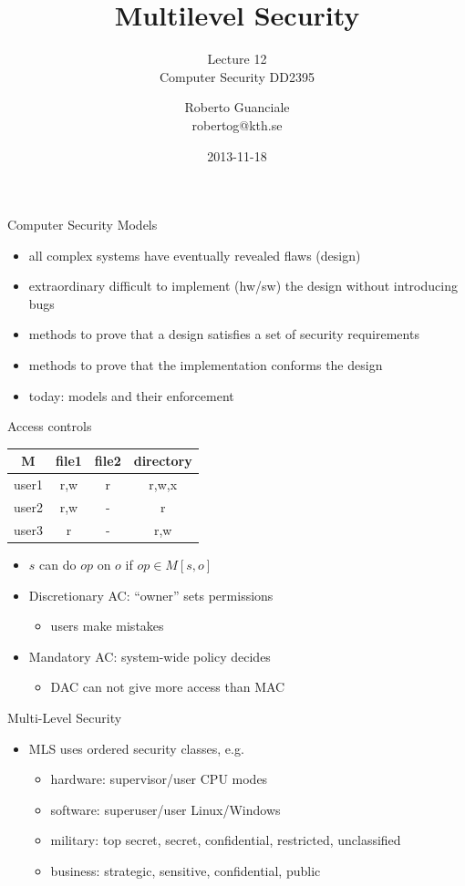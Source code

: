 \documentclass{beamer}
\title{Multilevel Security}
\subtitle{Lecture 12 \\ Computer Security DD2395}
\author[R. Guanciale]{
  Roberto Guanciale\\
  robertog@kth.se
}
\date{2013-11-18}
\begin{document}
\begin{frame}[plain]
  \titlepage
\end{frame}

\begin{frame}{Computer Security Models}
  \begin{itemize}
  \item all complex systems have eventually revealed flaws (design)
  \item extraordinary difficult to implement (hw/sw) the design
    without introducing bugs
  \item methods to prove that a design satisfies a set of security requirements
  \item methods to prove that the implementation conforms the design
  \item today: models and their enforcement
  \end{itemize}
\end{frame}

\begin{frame}{Access controls}
  \begin{tabular}{|c|c|c|c|}
    \hline
    M & file1 & file2 & directory \\
    \hline
    user1 & r,w & r & r,w,x \\
    \hline
    user2 & r,w & - & r \\
    \hline
    user3 & r & - & r,w \\
    \hline
  \end{tabular}
  \begin{itemize}
  \item $s$ can do $op$ on $o$ if $op \in M[s,o]$
  \item Discretionary AC: ``owner'' sets permissions
    \begin{itemize}
      \item users make mistakes
    \end{itemize}
  \item Mandatory AC: system-wide policy decides
    \begin{itemize}
      \item DAC can not give more access than MAC
    \end{itemize}
  \end{itemize}
\end{frame}

\begin{frame}{Multi-Level Security}
  \begin{itemize}
  \item MLS uses ordered security classes, e.g.
    \begin{itemize}
    \item hardware: supervisor/user CPU modes
    \item software: superuser/user Linux/Windows
    \item military: top secret, secret, confidential, restricted, unclassified 
    \item business: strategic, sensitive, confidential, public
    \end{itemize}
  \end{itemize}
\end{frame}
\end{document}
